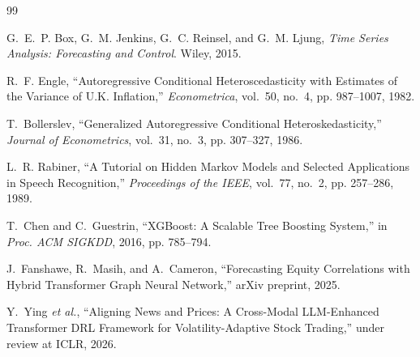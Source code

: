 \documentclass[conference]{IEEEtran}
\begin{document}
\balance
\begin{thebibliography}{99}

G.~E.~P. Box, G.~M. Jenkins, G.~C. Reinsel, and G.~M. Ljung, \emph{Time Series Analysis: Forecasting and Control}. Wiley, 2015.

R.~F. Engle, ``Autoregressive Conditional Heteroscedasticity with Estimates of the Variance of U.K. Inflation,'' \emph{Econometrica}, vol.~50, no.~4, pp. 987--1007, 1982.

T.~Bollerslev, ``Generalized Autoregressive Conditional Heteroskedasticity,'' \emph{Journal of Econometrics}, vol.~31, no.~3, pp. 307--327, 1986.

L.~R. Rabiner, ``A Tutorial on Hidden Markov Models and Selected Applications in Speech Recognition,'' \emph{Proceedings of the IEEE}, vol.~77, no.~2, pp. 257--286, 1989.

T.~Chen and C.~Guestrin, ``XGBoost: A Scalable Tree Boosting System,'' in \emph{Proc. ACM SIGKDD}, 2016, pp. 785--794.

J.~Fanshawe, R.~Masih, and A.~Cameron, ``Forecasting Equity Correlations with Hybrid Transformer Graph Neural Network,'' arXiv preprint, 2025.

Y.~Ying \emph{et al.}, ``Aligning News and Prices: A Cross-Modal LLM-Enhanced Transformer DRL Framework for Volatility-Adaptive Stock Trading,'' under review at ICLR, 2026.

\end{thebibliography}
\end{document}
